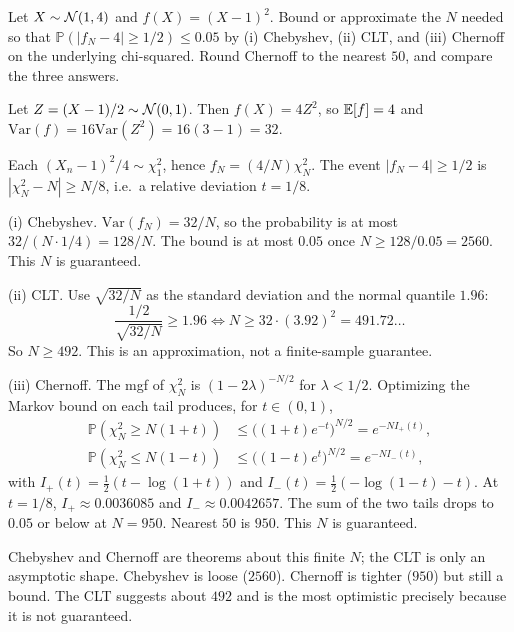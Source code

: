 \begin{hwqbox}
Let $X\sim\mathcal{N}(1,4)$ and $f(X)=(X-1)^2$. Bound or approximate the $N$ needed so that $\mathbb P(|f_N-4|\ge 1/2)\le 0.05$ by (i) Chebyshev, (ii) CLT, and (iii) Chernoff on the underlying chi-squared. Round Chernoff to the nearest $50$, and compare the three answers.
\end{hwqbox}
\begin{hwsolbox}
Let $Z=(X-1)/2\sim\mathcal{N}(0,1)$. Then $f(X)=4Z^2$, so $\mathbb{E}[f]=4$ and $\mathrm{Var}(f)=16\mathrm{Var}(Z^2)=16(3-1)=32$.

Each $(X_n-1)^2/4\sim\chi^2_1$, hence $f_N=(4/N)\chi^2_N$. The event $|f_N-4|\ge 1/2$ is $|\chi^2_N-N|\ge N/8$, i.e.\ a relative deviation $t=1/8$.

(i) Chebyshev. $\mathrm{Var}(f_N)=32/N$, so the probability is at most $32/(N\cdot 1/4)=128/N$. The bound is at most $0.05$ once $N\ge 128/0.05=2560$. This $N$ is guaranteed.

(ii) CLT. Use $\sqrt{32/N}$ as the standard deviation and the normal quantile $1.96$:
\[
\frac{1/2}{\sqrt{32/N}}\ge 1.96
\iff N\ge 32\cdot(3.92)^2=491.72\ldots
\]
So $N\ge 492$. This is an approximation, not a finite-sample guarantee.

(iii) Chernoff. The mgf of $\chi^2_N$ is $(1-2\lambda)^{-N/2}$ for $\lambda<1/2$. Optimizing the Markov bound on each tail produces, for $t\in(0,1)$,
\begin{align*}
\mathbb P(\chi^2_N\ge N(1+t))&\le\big((1+t)e^{-t}\big)^{N/2}=e^{-NI_+(t)},\\
\mathbb P(\chi^2_N\le N(1-t))&\le\big((1-t)e^{t}\big)^{N/2}=e^{-NI_-(t)},
\end{align*}
with $I_+(t)=\tfrac12(t-\log(1+t))$ and $I_-(t)=\tfrac12(-\log(1-t)-t)$. At $t=1/8$, $I_+\approx 0.0036085$ and $I_-\approx 0.0042657$. The sum of the two tails drops to $0.05$ or below at $N=950$. Nearest $50$ is $950$. This $N$ is guaranteed.

Chebyshev and Chernoff are theorems about this finite $N$; the CLT is only an asymptotic shape. Chebyshev is loose ($2560$). Chernoff is tighter ($950$) but still a bound. The CLT suggests about $492$ and is the most optimistic precisely because it is not guaranteed.
\end{hwsolbox}

